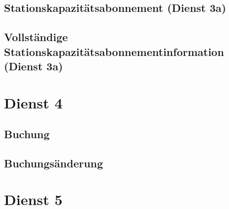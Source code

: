 \subsection*{Stationskapazitätsabonnement (Dienst 3a)}
\label{subsec:Nachrichten:Dienst3:PlaceAvailabilitySubscription}







\subsection*{Vollständige Stationskapazitätsabonnementinformation (Dienst 3a)}
\label{subsec:Nachrichten:Dienst3:CompletePlaceAvailability}





\section{Dienst 4}
\label{subsec:Nachrichten:Dienst4}

\subsection*{Buchung}
\label{subsec:Nachrichten:Dienst4:Booking}





\subsection*{Buchungsänderung}
\label{subsec:Nachrichten:Dienst4:ChangeBooking}





\section{Dienst 5}
\label{subsec:Nachrichten:Dienst5}

